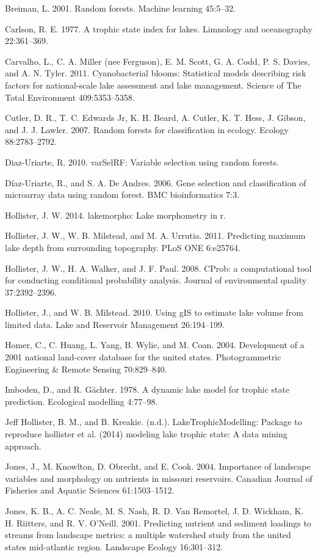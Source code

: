 \documentclass[11pt,]{article}
\begin{document}
Breiman, L. 2001. Random forests. Machine learning 45:5--32.

Carlson, R. E. 1977. A trophic state index for lakes. Limnology and
oceanography 22:361--369.

Carvalho, L., C. A. Miller (nee Ferguson), E. M. Scott, G. A. Codd, P.
S. Davies, and A. N. Tyler. 2011. Cyanobacterial blooms: Statistical
models describing risk factors for national-scale lake assessment and
lake management. Science of The Total Environment 409:5353--5358.

Cutler, D. R., T. C. Edwards Jr, K. H. Beard, A. Cutler, K. T. Hess, J.
Gibson, and J. J. Lawler. 2007. Random forests for classification in
ecology. Ecology 88:2783--2792.

Diaz-Uriarte, R. 2010. varSelRF: Variable selection using random
forests.

D{í}az-Uriarte, R., and S. A. De Andres. 2006. Gene selection and
classification of microarray data using random forest. BMC
bioinformatics 7:3.

Hollister, J. W. 2014. lakemorpho: Lake morphometry in r.

Hollister, J. W., W. B. Milstead, and M. A. Urrutia. 2011. Predicting
maximum lake depth from surrounding topography. PLoS ONE 6:e25764.

Hollister, J. W., H. A. Walker, and J. F. Paul. 2008. CProb: a
computational tool for conducting conditional probability analysis.
Journal of environmental quality 37:2392--2396.

Hollister, J., and W. B. Milstead. 2010. Using gIS to estimate lake
volume from limited data. Lake and Reservoir Management 26:194--199.

Homer, C., C. Huang, L. Yang, B. Wylie, and M. Coan. 2004. Development
of a 2001 national land-cover database for the united states.
Photogrammetric Engineering \& Remote Sensing 70:829--840.

Imboden, D., and R. G{ä}chter. 1978. A dynamic lake model for trophic
state prediction. Ecological modelling 4:77--98.

Jeff Hollister, B. M., and B. Kreakie. (n.d.). LakeTrophicModelling:
Package to reproduce hollister et al. (2014) modeling lake trophic
state: A data mining approach.

Jones, J., M. Knowlton, D. Obrecht, and E. Cook. 2004. Importance of
landscape variables and morphology on nutrients in missouri reservoirs.
Canadian Journal of Fisheries and Aquatic Sciences 61:1503--1512.

Jones, K. B., A. C. Neale, M. S. Nash, R. D. Van Remortel, J. D.
Wickham, K. H. Riitters, and R. V. O'Neill. 2001. Predicting nutrient
and sediment loadings to streams from landscape metrics: a multiple
watershed study from the united states mid-atlantic region. Landscape
Ecology 16:301--312.
\end{document}
